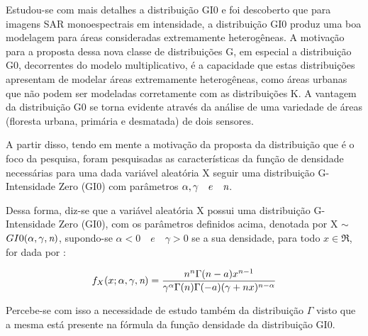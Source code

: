 Estudou-se com mais detalhes a distribuição GI0 e foi descoberto que para imagens SAR monoespectrais em intensidade, a distribuição GI0 produz uma boa modelagem para áreas consideradas extremamente heterogêneas. A motivação para a proposta dessa nova classe de distribuições G, em especial a distribuição G0, decorrentes do modelo multiplicativo, é a capacidade que estas distribuições apresentam de modelar áreas extremamente heterogêneas, como áreas urbanas que não podem ser modeladas corretamente com as distribuições K. A vantagem da distribuição G0 se torna evidente através da análise de uma variedade de áreas (floresta urbana, primária e desmatada) de dois sensores.

A partir disso, tendo em mente a motivação da proposta da distribuição que é o foco da pesquisa, foram pesquisadas as características da função de densidade necessárias para uma dada variável aleatória X seguir uma distribuição G-Intensidade Zero (GI0) com parâmetros \begin{math} \alpha , \gamma \quad e \quad \emph{n} \end{math}.

Dessa forma, diz-se que a variável aleatória X possui uma distribuição G-Intensidade Zero (GI0), com os 
parâmetros definidos acima, denotada por  X $\sim$  \begin{math} GI0(\alpha, \gamma ,\emph{n}) \end{math}, supondo-se \begin{math} \alpha < 0 \quad e \quad \gamma > 0 \end{math} se a sua densidade, para todo \begin{math} x \in \Re \end{math}, for dada por :

\begin{equation}
	f_{X}(x;\alpha, \gamma, \emph{n}) = \frac{n^{n}\Gamma(n-a)x^{n-1}}{\gamma^{\alpha}\Gamma(n)\Gamma(-a)(\gamma + nx)^{n-\alpha}} 
\end{equation}

Percebe-se com isso a necessidade de estudo também da distribuição \begin{math} \Gamma \end{math} visto que a mesma está presente na fórmula da função densidade da distribuição GI0.

